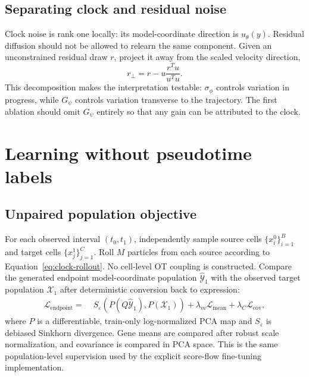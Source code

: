 \documentclass[11pt]{article}
\begin{document}
\subsection{Separating clock and residual noise}

Clock noise is rank one locally: its model-coordinate direction is
$u_\theta(y)$. Residual diffusion should not be allowed to relearn the same
component. Given an unconstrained residual draw $r$, project it away from the
scaled velocity direction,
\begin{equation}
  r_\perp
  = r-u\frac{r^Tu}{u^Tu}.
  \label{eq:orthogonal-noise}
\end{equation}
This decomposition makes the interpretation testable: $\sigma_\phi$ controls
variation in progress, while $G_\psi$ controls variation transverse to the
trajectory. The first ablation should omit $G_\psi$ entirely so that any gain
can be attributed to the clock.

\section{Learning without pseudotime labels}

\subsection{Unpaired population objective}

For each observed interval $(t_0,t_1)$, independently sample source cells
$\{x_i^0\}_{i=1}^{B}$ and target cells $\{x_j^1\}_{j=1}^{C}$. Roll $M$
particles from each source according to Equation~\ref{eq:clock-rollout}. No
cell-level OT coupling is constructed. Compare the generated endpoint
model-coordinate population $\widehat{\mathcal Y}_1$ with the observed target
population $\mathcal X_1$ after deterministic conversion back to expression:
\begin{align}
  \mathcal L_{\mathrm{endpoint}}
  =&\;S_\varepsilon\!\left(
      P(Q\widehat{\mathcal Y}_1),P(\mathcal X_1)
    \right)
  +\lambda_m\mathcal L_{\mathrm{mean}}
  +\lambda_C\mathcal L_{\mathrm{cov}},
  \label{eq:endpoint-loss}
\end{align}
where $P$ is a differentiable, train-only log-normalized PCA map and
$S_\varepsilon$ is debiased Sinkhorn divergence. Gene means are compared after
robust scale normalization, and covariance is compared in PCA space. This is
the same population-level supervision used by the explicit score-flow
fine-tuning implementation.
\end{document}
